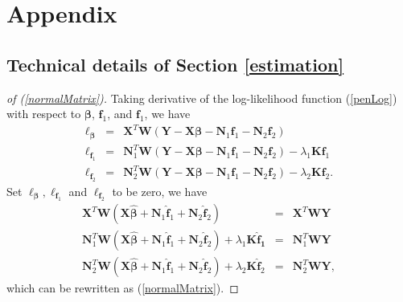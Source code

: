 \documentclass[article,lineno]{biometrika}
\begin{document}
\appendixtwo
\section*{Appendix} 
\subsection*{Technical details of Section \ref{estimation}}  \label{appEst}

%
%
%
\begin{proof}[of (\ref{normalMatrix})]
Taking derivative of the log-likelihood function (\ref{penLog}) with respect to $\bm \beta$, $\bm f_1$, and $\bm f_1$, we have
\begin{eqnarray*}
\ell_{\bm \beta} &=&\boldsymbol X^T  \boldsymbol W
(\boldsymbol Y - \boldsymbol X \boldsymbol \beta 
- \boldsymbol N_1 \boldsymbol f_1 -
\boldsymbol N_2 \boldsymbol f_2) \\
\ell_{\bm f_1}
&=&
\boldsymbol N_1^T  \boldsymbol W
(\boldsymbol Y - \boldsymbol X \boldsymbol \beta - \boldsymbol N_1 \boldsymbol f_1 -
\boldsymbol N_2 \boldsymbol f_2)
- \lambda_1 \bm K \bm f_1 \\
\ell_{\boldsymbol f_2} 
&=& 
\boldsymbol N_2^T  \boldsymbol W
(\boldsymbol Y - \boldsymbol X \boldsymbol \beta - \boldsymbol N_1 \boldsymbol f_1 -
\boldsymbol N_2 \boldsymbol f_2)
- \lambda_2 \boldsymbol K  \boldsymbol f_2.
\end{eqnarray*}
Set $\ell_{\bm \beta}, \ell_{\bm f_1}$ and $\ell_{\bm f_2}$ to be zero, we have 
\begin{eqnarray}
\boldsymbol X^T  \boldsymbol W
(\boldsymbol X \boldsymbol {\hat \beta} 
+  \boldsymbol N_1 \boldsymbol {\hat f}_1
+  \boldsymbol N_2 \boldsymbol {\hat f}_2)
&=&  \boldsymbol X^T  \boldsymbol W \boldsymbol Y 
\label{normal_beta} \\
\boldsymbol N_1^T  \boldsymbol W
(\boldsymbol X \boldsymbol {\hat \beta} +  \boldsymbol N_1 \boldsymbol {\hat f}_1 
+ \boldsymbol N_2 \boldsymbol {\hat f}_2) 
+ \lambda_1 \boldsymbol K \boldsymbol {\hat f_1}
&=&
\boldsymbol N_1^T  \boldsymbol W \boldsymbol Y  
\label{normal_f1} \\
\boldsymbol N_2^T  \boldsymbol W
(\boldsymbol X \boldsymbol {\hat \beta} +  \boldsymbol N_1 \boldsymbol {\hat f}_1 
+ \boldsymbol N_2 \boldsymbol {\hat f}_2) 
+
\lambda_2 \boldsymbol K\boldsymbol {\hat f}_2
&=&  
\boldsymbol N_2^T  \boldsymbol W \boldsymbol Y,
 \label{normal_f2} 
\end{eqnarray}
which can be rewritten as (\ref{normalMatrix}).
\end{proof}
\end{document}
